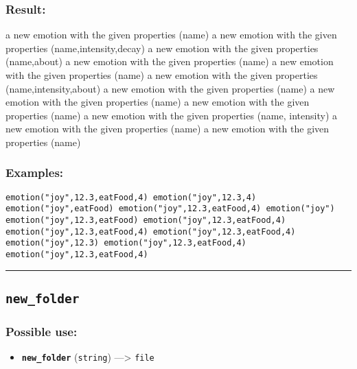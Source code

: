 \documentclass[]{book}
\providecommand{\tightlist}{%
  \setlength{\itemsep}{0pt}\setlength{\parskip}{0pt}}
\theoremstyle{definition}
\theoremstyle{definition}
\theoremstyle{definition}
\theoremstyle{remark}
\begin{document}
\subsubsection{Result:}\label{result-356}

a new emotion with the given properties (name) a new emotion with the
given properties (name,intensity,decay) a new emotion with the given
properties (name,about) a new emotion with the given properties (name) a
new emotion with the given properties (name) a new emotion with the
given properties (name,intensity,about) a new emotion with the given
properties (name) a new emotion with the given properties (name) a new
emotion with the given properties (name) a new emotion with the given
properties (name, intensity) a new emotion with the given properties
(name) a new emotion with the given properties (name)

\subsubsection{Examples:}\label{examples-255}

\begin{verbatim}
emotion("joy",12.3,eatFood,4) emotion("joy",12.3,4) emotion("joy",eatFood) emotion("joy",12.3,eatFood,4) emotion("joy") emotion("joy",12.3,eatFood) emotion("joy",12.3,eatFood,4) emotion("joy",12.3,eatFood,4) emotion("joy",12.3,eatFood,4) emotion("joy",12.3) emotion("joy",12.3,eatFood,4) emotion("joy",12.3,eatFood,4) 
\end{verbatim}

\begin{center}\rule{0.5\linewidth}{\linethickness}\end{center}

\subsection{\texorpdfstring{\texttt{new\_folder}}{new\_folder}}\label{new_folder}

\subsubsection{Possible use:}\label{possible-use-369}

\begin{itemize}
\tightlist
\item
  \textbf{\texttt{new\_folder}} (\texttt{string}) ---\textgreater{}
  \texttt{file}
\end{itemize}
\end{document}
